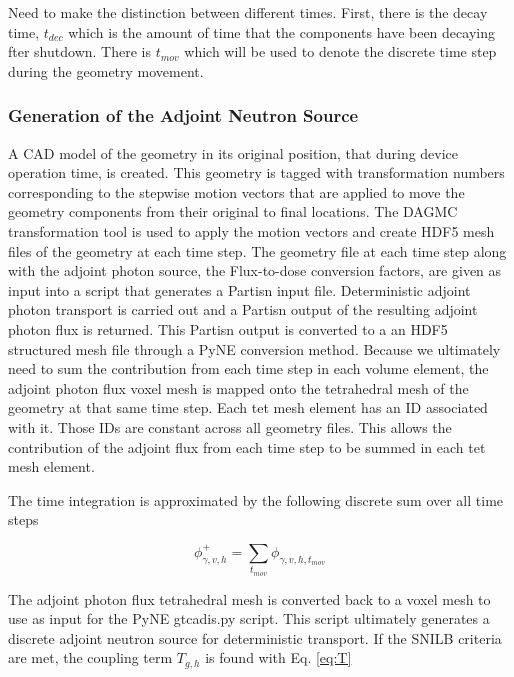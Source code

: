 Need to make the distinction between different times.  First, there is the
decay time, $t_{dec}$ which is the amount of time that the components have been
decaying fter shutdown.  There is $t_{mov}$ which will be used to denote the
discrete time step during the geometry movement.

\subsubsection{Generation of the Adjoint Neutron Source}
A CAD model of the geometry in its original position, that during device
operation time, is created.  This geometry is tagged with transformation
numbers corresponding to the stepwise motion vectors that are applied to move the
geometry components from their original to final locations.  The DAGMC
transformation tool is used to apply the motion vectors and create HDF5 mesh
files of the geometry at each time step.   
The geometry file at each time step along with the adjoint photon source, the
Flux-to-dose conversion factors, are given as input into a script that
generates a Partisn input file.  Deterministic adjoint photon transport is
carried out and a Partisn output of the resulting adjoint photon flux is
returned.  This Partisn output is converted to a an HDF5 structured mesh file
through a PyNE conversion method.  
Because we ultimately need to sum the contribution from each time step in each
volume element, the adjoint photon flux voxel mesh is mapped onto the
tetrahedral mesh of the geometry at that same time step.  Each tet
mesh element has an ID associated with it.  Those IDs are constant across all
geometry files.  This allows the contribution of the adjoint flux from each
time step to be summed in each tet mesh element.

The time integration is approximated by the following discrete sum over all
time steps

\begin{equation}\label{eq:sum}
	\phi_{\gamma,v, h}^{+} = \sum_{t_{mov}}{\phi_{\gamma,v,h,t_{mov}}}
\end{equation}

The adjoint photon flux tetrahedral mesh is converted back to a voxel mesh
to use as input for the PyNE gtcadis.py script. This script ultimately generates  a
discrete adjoint neutron source for deterministic transport.
If the SNILB criteria are met, the coupling term $T_{g,h}$ is found with Eq.
\ref{eq:T}


